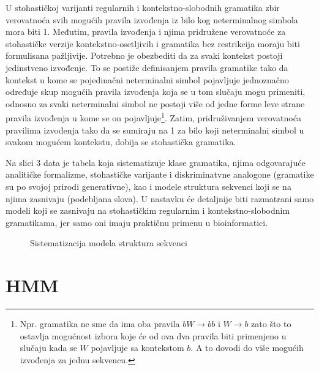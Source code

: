 \documentclass[a4paper, 12pt]{article}
\begin{document}
U stohastičkoj varijanti regularnih i kontekstno-slobodnih gramatika zbir verovatnoća svih mogućih pravila izvođenja iz bilo kog neterminalnog simbola mora biti 1. Međutim, pravila izvođenja i njima pridružene verovatnoće za stohastičke verzije kontekstno-osetljivih i gramatika bez restrikcija moraju biti formulisana pažljivije. Potrebno je obezbediti da za svaki kontekst postoji jedinstveno izvođenje. To se postiže definisanjem pravila gramatike tako da kontekst u kome se pojedinačni neterminalni simbol pojavljuje jednoznačno određuje skup mogućih pravila izvođenja koja se u tom slučaju mogu primeniti, odnosno za svaki neterminalni simbol ne postoji više od jedne forme leve strane pravila izvođenja u kome se on pojavljuje\footnote{Npr. gramatika ne sme da ima oba pravila $bW \rightarrow bb$ i $W \rightarrow b$ zato što to ostavlja mogućnost izbora koje će od ova dva pravila biti primenjeno u slučaju kada se $W$ pojavljuje sa kontekstom $b$. A to dovodi do više mogućih izvođenja za jednu sekvencu.}. Zatim, pridruživanjem verovatnoća pravilima izvođenja tako da se sumiraju na 1 za bilo koji neterminalni simbol u svakom mogućem kontekstu, dobija se stohastička gramatika.

Na slici 3 data je tabela koja sistematizuje klase gramatika, njima odgovarajuće analitičke formalizme, stohastičke varijante i diskriminatvne analogone (gramatike su po svojoj prirodi generativne), kao i modele struktura sekvenci koji se na njima zasnivaju (podebljana slova). U nastavku će detaljnije biti razmatrani samo modeli koji se zasnivaju na stohastičkim regularnim i kontekstno-slobodnim gramatikama, jer samo oni imaju praktičnu primenu u bioinformatici.

\begin{figure}[h!]
    \centering
    \vspace{0.15cm}
    \vspace{0.2cm}
    \caption{Sistematizacija modela struktura sekvenci}
\end{figure}

\section{HMM}
\end{document}
